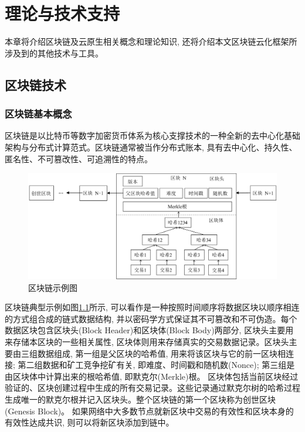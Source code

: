 \chapter{理论与技术支持}

本章将介绍区块链及云原生相关概念和理论知识, 还将介绍本文区块链云化框架所涉及到的其他技术与工具。

\section{区块链技术}\label{section: blockchain}

\subsection{区块链基本概念}
区块链是以比特币等数字加密货币体系为核心支撑技术的一种全新的去中心化基础架构与分布式计算范式\cite{1016383}。区块链通常被当作分布式账本, 具有去中心化、持久性、匿名性、不可篡改性、可追溯性的特点。

\begin{figure}[h] %
    \centering %
    \includegraphics[width=1\textwidth]{FIGs/chapter2/blockchain_example.pdf} %
    \caption{区块链示例图} %
    \label{blockchain_example} %
\end{figure}%

区块链典型示例如图\ref{blockchain_example}所示, 可以看作是一种按照时间顺序将数据区块以顺序相连的方式组合成的链式数据结构, 并以密码学方式保证其不可篡改和不可伪造。每个数据区块包含区块头(Block Header)和区块体(Block Body)两部分, 区块头主要用来存储本区块的一些相关属性, 区块体则用来存储真实的交易数据记录。区块头主要由三组数据组成, 第一组是父区块的哈希值, 用来将该区块与它的前一区块相连接; 第二组数据和矿工竞争挖矿有关, 即难度、时间戳和随机数(Nonce); 第三组是由区块体中计算出来的根哈希值, 即默克尔(Merkle)根。
区块体包括当前区块经过验证的、区块创建过程中生成的所有交易记录。这些记录通过默克尔树的哈希过程生成唯一的默克尔根并记入区块头。整个区块链的第一个区块称为创世区块(Genesis Block)。
如果网络中大多数节点就新区块中交易的有效性和区块本身的有效性达成共识, 则可以将新区块添加到链中。

